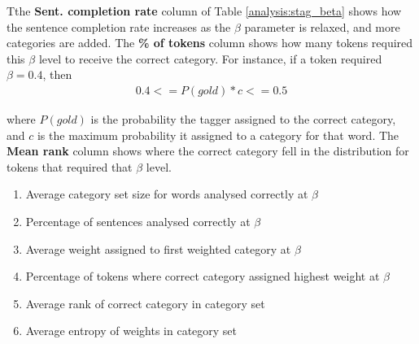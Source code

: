 Tthe \textbf{Sent. completion rate} column of Table \ref{analysis:stag_beta} shows how the sentence completion rate increases as the $\beta$ parameter is relaxed, and more categories are added. The \textbf{\% of tokens} column shows how many tokens required this $\beta$ level to receive the correct category. For instance, if a token required $\beta=0.4$, then
\begin{eqnarray}
0.4 <= P(gold)*c <= 0.5
\end{eqnarray}

where $P(gold)$ is the probability the tagger assigned to the correct category, and $c$ is the maximum probability it assigned to a category for that word. The \textbf{Mean rank} column shows where the correct category fell in the distribution for tokens that required that $\beta$ level.





\begin{enumerate}
\item Average category set size for words analysed correctly at $\beta$
\item Percentage of sentences analysed correctly at $\beta$
\item Average weight assigned to first weighted category at $\beta$
\item Percentage of tokens where correct category assigned highest weight at $\beta$
\item Average rank of correct category in category set
\item Average entropy of weights in category set
\end{enumerate}

